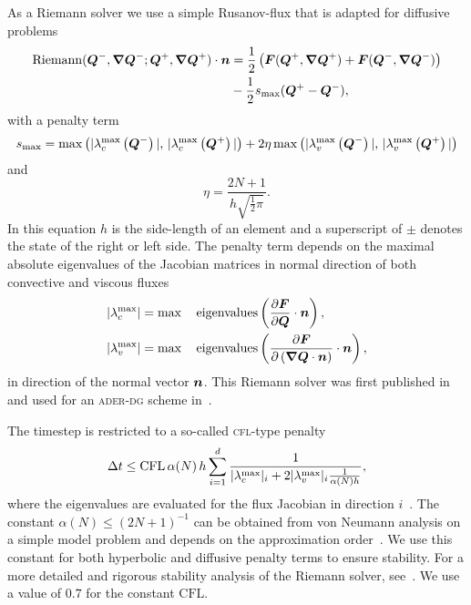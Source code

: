 As a Riemann solver we use a simple Rusanov-flux that is adapted for diffusive problems
\begin{equation}
  \label{eq:rusanov-flux}
  \begin{split}
  \Riemann(\Q^-, \gradQ^-; \Q^+, \gradQ^+) \cdot \normal &=
  \frac{1}{2} \left(
    \flux(\Q^+, \gradQ^+) +
    \flux(\Q^-, \gradQ^-)
  \right)
  \\&-
  \frac{1}{2} s_\text{max} (\Q^+ - \Q^-),
  \end{split}
\end{equation}
with a penalty term
\begin{equation}
  \label{eq:parabolic-penalty}
  s_\text{max}  = \max \left(
\maxConvEigen[\Q^-], \, \maxConvEigen[\Q^+]
\right) +
2 \eta \max \left(
\maxViscEigen[\Q^-], \, \maxViscEigen[\Q^+]
\right)
\end{equation}
and
\begin{equation}
  \eta = \frac{2N+1}{h \sqrt{\frac{1}{2} \pi}}.
\end{equation}
In this equation $h$ is the side-length of an element and a superscript of $\pm$ denotes the state of the right or left side.
The penalty term depends on the maximal absolute eigenvalues of the Jacobian matrices in normal direction of both convective and viscous fluxes
\begin{align}
  \begin{split}
    \maxConvEigen &= \max \quad \operatorname{eigenvalues} \left( \pdv{\flux}{\Q} \cdot \normal  \right),\\
    \maxViscEigen &= \max \quad \operatorname{eigenvalues} \left( \pdv{\flux}{\left( \gradQ \cdot \normal \right)} \cdot \normal \right),
  \end{split}
\end{align}
in direction of the normal vector $\bm{n}$. 
This Riemann solver was first published in~\cite{gassner2008discontinuous} and used for an \textsc{ader-dg} scheme in~\cite{dumbser2010arbitrary}.

The timestep is restricted to a so-called \textsc{cfl}-type penalty
\begin{equation}\label{eq:cfl-aderdg}
 \Delta t \leq  \text{CFL} \, \alpha(N) \, h \sum_{i=1}^{\dimensions} \frac{1}{\maxConvEigen_i + 2 \maxViscEigen_i \frac{1}{\alpha(N) h}},
\end{equation}
where the eigenvalues are evaluated for the flux Jacobian in direction $i$~\cite{dumbser2010arbitrary,gassner2008discontinuous}.
The constant $\alpha(N) \leq {\left( 2N+1  \right)}^{-1}$ can be obtained from von Neumann analysis on a simple model problem and depends on the approximation order~\cite{dumbser2008unified}.
We use this constant for both hyperbolic and diffusive penalty terms to ensure stability.
For a more detailed and rigorous stability analysis of the Riemann solver, see~\cite{gassner2008discontinuous}.
We use a value of $0.7$ for the constant $\text{CFL}$.


